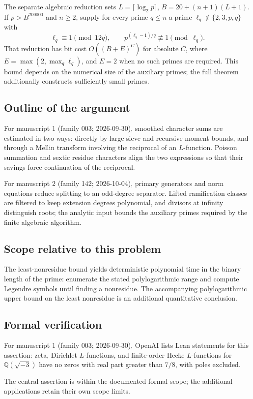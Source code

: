 \documentclass[11pt]{article}
\begin{document}
The separate algebraic reduction sets $L=\lceil\log_2p\rceil$, $B=20+(n+1)(L+1)$. If $p>B^{200000}$ and $n\ge2$, supply for every prime $q\le n$ a prime $\ell_q\notin\{2,3,p,q\}$ with
\[
 \ell_q\equiv1\pmod{12q},\qquad p^{(\ell_q-1)/q}\not\equiv1\pmod{\ell_q}.
\]
That reduction has bit cost $O((B+E)^C)$ for absolute $C$, where $E=\max(2,\max_q\ell_q)$, and $E=2$ when no such primes are required. This bound depends on the numerical size of the auxiliary primes; the full theorem additionally constructs sufficiently small primes.

\subsection{Outline of the argument}
For manuscript 1 (family 003; 2026-09-30), smoothed character sums are estimated in two ways: directly by large-sieve and recursive moment bounds, and through a Mellin transform involving the reciprocal of an $L$-function. Poisson summation and sextic residue characters align the two expressions so that their savings force continuation of the reciprocal.

For manuscript 2 (family 142; 2026-10-04), primary generators and norm equations reduce splitting to an odd-degree separator. Lifted ramification classes are filtered to keep extension degrees polynomial, and divisors at infinity distinguish roots; the analytic input bounds the auxiliary primes required by the finite algebraic algorithm.

\subsection{Scope relative to this problem}
The least-nonresidue bound yields deterministic polynomial time in the binary length of the prime: enumerate the stated polylogarithmic range and compute Legendre symbols until finding a nonresidue. The accompanying polylogarithmic upper bound on the least nonresidue is an additional quantitative conclusion.

\subsection{Formal verification}
For manuscript 1 (family 003; 2026-09-30), OpenAI lists Lean statements for this assertion: zeta, Dirichlet $L$-functions, and finite-order Hecke $L$-functions for $\mathbb Q(\sqrt{-3})$ have no zeros with real part greater than $7/8$, with poles excluded.

The central assertion is within the documented formal scope; the additional applications retain their own scope limits.
\end{document}
